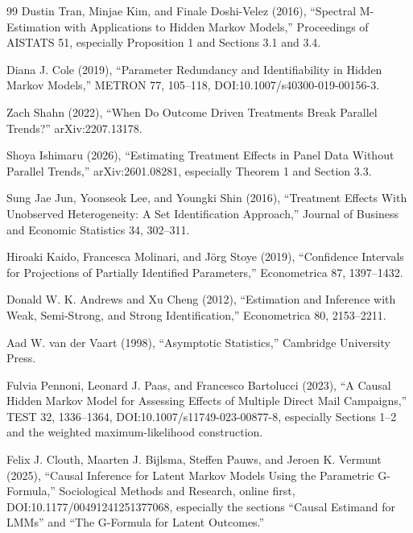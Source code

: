 \documentclass{article}
\begin{document}
\begin{thebibliography}{99}
   Dustin Tran, Minjae Kim, and Finale Doshi-Velez (2016), ``Spectral M-Estimation with Applications to Hidden Markov Models,'' Proceedings of AISTATS 51, especially Proposition 1 and Sections 3.1 and 3.4.

   Diana J. Cole (2019), ``Parameter Redundancy and Identifiability in Hidden Markov Models,'' METRON 77, 105--118, DOI:10.1007/s40300-019-00156-3.

   Zach Shahn (2022), ``When Do Outcome Driven Treatments Break Parallel Trends?'' arXiv:2207.13178.

   Shoya Ishimaru (2026), ``Estimating Treatment Effects in Panel Data Without Parallel Trends,'' arXiv:2601.08281, especially Theorem 1 and Section 3.3.

   Sung Jae Jun, Yoonseok Lee, and Youngki Shin (2016), ``Treatment Effects With Unobserved Heterogeneity: A Set Identification Approach,'' Journal of Business and Economic Statistics 34, 302--311.

   Hiroaki Kaido, Francesca Molinari, and Jörg Stoye (2019), ``Confidence Intervals for Projections of Partially Identified Parameters,'' Econometrica 87, 1397--1432.

   Donald W. K. Andrews and Xu Cheng (2012), ``Estimation and Inference with Weak, Semi-Strong, and Strong Identification,'' Econometrica 80, 2153--2211.

   Aad W. van der Vaart (1998), ``Asymptotic Statistics,'' Cambridge University Press.

   Fulvia Pennoni, Leonard J. Paas, and Francesco Bartolucci (2023), ``A Causal Hidden Markov Model for Assessing Effects of Multiple Direct Mail Campaigns,'' TEST 32, 1336--1364, DOI:10.1007/s11749-023-00877-8, especially Sections 1--2 and the weighted maximum-likelihood construction.

   Felix J. Clouth, Maarten J. Bijlsma, Steffen Pauws, and Jeroen K. Vermunt (2025), ``Causal Inference for Latent Markov Models Using the Parametric G-Formula,'' Sociological Methods and Research, online first, DOI:10.1177/00491241251377068, especially the sections ``Causal Estimand for LMMs'' and ``The G-Formula for Latent Outcomes.''

\end{thebibliography}
\end{document}
